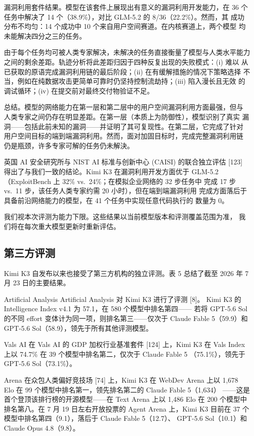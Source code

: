 漏洞利用套件结果。模型在该套件上展现出有意义的漏洞利用开发能力，在 36 个
任务中解决了 14 个（38.9\%），对比 GLM-5.2 的 8/36（22.2\%）。然而，其
成功分布不均匀：14 个成功中 10 个来自用户空间赛道。在内核赛道上，两个模型
均未能解决四分之三的任务。

由于每个任务均可被人类专家解决，未解决的任务直接衡量了模型与人类水平能力
之间的剩余差距。轨迹分析将此差距归因于四种反复出现的失败模式：(i) 难以
从已获取的原语完成漏洞利用链的最后阶段；(ii) 在有缓解措施的情况下策略选择
不当，例如在纯数据攻击更简单可靠时仍坚持控制流劫持；(iii) 陷入漫长且无效
的调试循环；(iv) 在提交前对最终交付物验证不足。

总结。模型的网络能力在第一层和第二层中的用户空间漏洞利用方面最强，但与
人类专家之间仍存在明显差距。在第一层（本质上为防御性），模型识别了真实
漏洞——包括此前未知的漏洞——并证明了其可复现性。在第二层，它完成了针对
用户空间目标的端到端漏洞利用。然而，面对加固目标时，完成完整漏洞利用链
仍是瓶颈，许多专家可解的任务仍未解決。

英国 AI 安全研究所与 NIST AI 标准与创新中心 (CAISI) 的联合独立评估
{[}123{]} 得出了与我们一致的结论。Kimi K3 在漏洞利用开发方面优于
GLM-5.2（ExploitBench 上 32\% vs.~24\%；在模拟企业网络的 32 步任务中
完成 17 步 vs.~11 步，该任务人类专家约需 20 小时），但在端到端漏洞利用
完成方面落后于具备前沿网络能力的模型，在 41 个任务中实现任意代码执行的
数量为 0。

我们视本次评测为能力下限。这些结果以当前模型版本和评测覆盖范围为准，
我们将在每次重大模型更新时重新评估。

\subsection{第三方评测}\label{third-party-evaluation}

Kimi K3 自发布以来也接受了第三方机构的独立评测。表 5 总结了截至 2026 年
7 月 23 日的主要结果。

Artificial Analysis Artificial Analysis 对 Kimi K3 进行了评测 {[}8{]}。
Kimi K3 的 Intelligence Index v4.1 为 57.1，在 580 个模型中排名第四——
若将 GPT-5.6 Sol 的不同 effort 变体计为同一项，则排名第三——仅次于 Claude
Fable 5（59.9）和 GPT-5.6 Sol（58.9），领先于所有其他评测模型。

Vals AI 在 Vals AI 的 GDP 加权行业基准套件 {[}124{]} 上，Kimi K3 在
Vals Index 上以 74.7\% 在 39 个模型中排名第二，仅次于 Claude Fable 5
（75.1\%），领先于 GPT-5.6 Sol（73.1\%）。

Arena 在众包人类偏好竞技场 {[}74{]} 上，Kimi K3 在 WebDev Arena 上以
1,678 Elo 在 99 个模型中排名第一，领先排名第二的 Claude Fable 5（1,634）
——这是首个登顶该排行榜的开源模型——在 Text Arena 上以 1,486 Elo 在 200
个模型中排名第八。在 7 月 19 日左右开放投票的 Agent Arena 上，Kimi K3
目前在 37 个模型中排名第四（9.1），落后于 Claude Fable 5（12.7）、
GPT-5.6 Sol（10.1）和 Claude Opus 4.8（9.8）。

